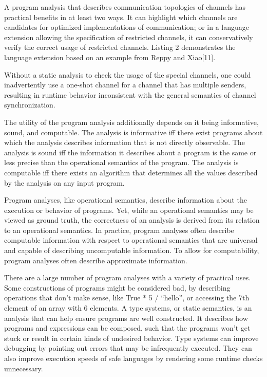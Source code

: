A program analysis that describes communication topologies of channels has practical benefits
in at least two ways.  It can highlight which channels are candidates for optimized
implementations of communication; or in a language extension allowing the specification of
restricted channels, it can conservatively verify the correct usage of restricted channels.
Listing 2 demonstrates the language extension based on an example from Reppy and Xiao[11].


Without a static analysis to check the usage of the special channels, one could inadvertently
use a one-shot channel for a channel that has multiple senders, resulting in runtime behavior
inconsistent with the general semantics of channel synchronization.

The utility of the program analysis additionally depends on it being informative, sound, and
computable.  The analysis is informative iff there exist programs about which the analysis
describes information that is not directly observable.  The analysis is sound iff the
information it describes about a program is the same or less precise than the operational
semantics of the program. The analysis is computable iff there exists an algorithm that
determines all the values described by the analysis on any input program.

Program analyses, like operational semantics, describe information about the execution or
behavior of programs.  Yet, while an operational semantics may be viewed as ground truth, the
correctness of an analysis is derived from its relation to an operational semantics.  In
practice, program analyses often describe computable information with respect to operational
semantics that are universal and capable of describing uncomputable information.  To allow for
computability, program analyses often describe approximate information.

There are a large number of program analyses with a variety of practical uses.  Some
constructions of programs might be considered bad, by describing operations that don't make
sense, like True * 5 / “hello”, or accessing the 7th element of an array with 6 elements.  A
type systems, or static semantics, is an analysis that can help ensure programs are well
constructed.  It describes how programs and expressions can be composed, such that the programs
won't get stuck or result in certain kinds of undesired behavior.  Type systems can improve
debugging by pointing out errors that may be infrequently executed.  They can also improve
execution speeds of safe languages by rendering some runtime checks unnecessary.  

